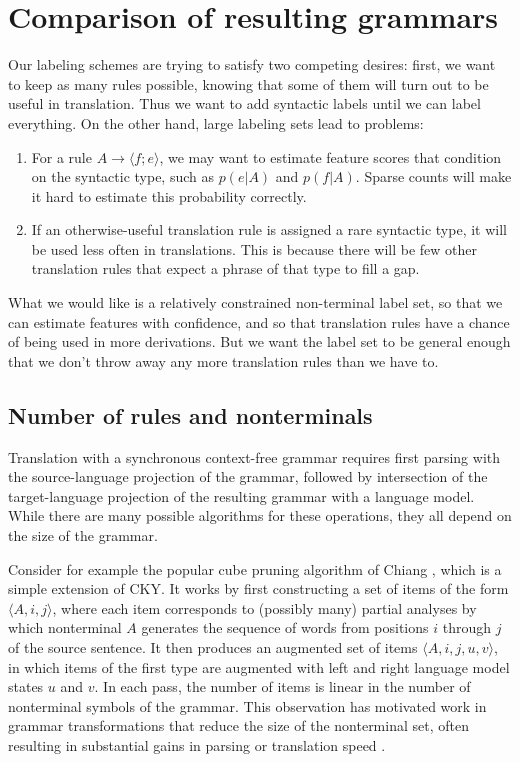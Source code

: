 \documentclass{article}
\begin{document}
\section{Comparison of resulting grammars}

Our labeling schemes are trying to satisfy two competing desires: first, we want to keep as many rules possible, knowing that some of them will turn out to be useful in translation. Thus we want to add syntactic labels until we can label everything. On the other hand, large labeling sets lead to problems:
\begin{enumerate}
\item For a rule $A \to \langle f ; e \rangle$, we may want to estimate feature scores that condition on the syntactic type, such as $p(e|A)$ and $p(f|A)$. Sparse counts will make it hard to estimate this probability correctly.
\item If an otherwise-useful translation rule is assigned a rare syntactic type, it will be used less often in translations. This is because there will be few other translation rules that expect a phrase of that type to fill a gap.
\end{enumerate}
What we would like is a relatively constrained non-terminal label set, so that we can estimate features with confidence, and so that translation rules have a chance of being used in more derivations. But we want the label set to be general enough that we don't throw away any more translation rules than we have to.


\subsection{Number of rules and nonterminals}

Translation with a synchronous context-free grammar requires first parsing with the source-language projection of the grammar, followed by intersection of the target-language projection of the resulting grammar with a language model. While there are many possible algorithms for these operations, they all depend on the size of the grammar.

Consider for example the popular cube pruning algorithm of Chiang
, which is a simple extension of CKY. It works by first
constructing a set of items of the form $\langle A, i, j \rangle$,
where each item corresponds to (possibly many) partial analyses by
which nonterminal $A$ generates the sequence of words from positions
$i$ through $j$ of the source sentence. It then produces an augmented
set of items $\langle A, i, j, u, v \rangle$, in which items of the
first type are augmented with left and right language model states $u$
and $v$. In each pass, the number of items is linear in the number of
nonterminal symbols of the grammar. This observation has motivated
work in grammar transformations that reduce the size of the
nonterminal set, often resulting in substantial gains in parsing or
translation speed \cite{song2008,denero-efficient-parsing,xiao2009}.
\end{document}
